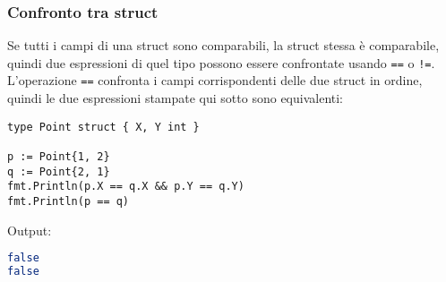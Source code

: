 \documentclass[../../../thesis.tex]{subfiles}
\begin{document}
    \subsubsection{Confronto tra struct}
    Se tutti i campi di una struct sono comparabili, la struct stessa è comparabile, quindi due espressioni di quel tipo possono essere confrontate usando \verb"==" o \verb"!=".
    L'operazione \verb"==" confronta i campi corrispondenti delle due struct in ordine, quindi le due espressioni stampate qui sotto sono equivalenti:
    \begin{lstlisting}[frame = single,label={lst:lstlisting3-4-2.1}]
type Point struct { X, Y int }

p := Point{1, 2}
q := Point{2, 1}
fmt.Println(p.X == q.X && p.Y == q.Y)
fmt.Println(p == q)
    \end{lstlisting}
    Output:
    \begin{lstlisting}[language = bash, frame = L,label={lst:lstlisting3-4-2.2}]
false
false
    \end{lstlisting}
\end{document}
